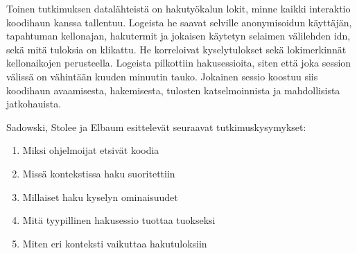 \documentclass[finnish]{../tktltiki2}
\theoremstyle{definition}
\theoremstyle{remark}
\begin{document}
Toinen tutkimuksen datalähteistä on hakutyökalun lokit, minne kaikki interaktio koodihaun kanssa tallentuu. Logeista he saavat selville anonymisoidun käyttäjän, tapahtuman kellonajan, hakutermit ja jokaisen käytetyn selaimen välilehden idn, sekä mitä tuloksia on klikattu. He korreloivat kyselytulokset sekä lokimerkinnät kellonaikojen perusteella. Logeista pilkottiin hakusessioita, siten että joka session välissä on vähintään kuuden minuutin tauko. Jokainen sessio koostuu siis koodihaun avaamisesta, hakemisesta, tulosten katselmoinnista ja mahdollisista jatkohauista. %






Sadowski, Stolee ja Elbaum esittelevät seuraavat tutkimuskysymykset:

\begin{enumerate}

  \item Miksi ohjelmoijat etsivät koodia %

  \item Missä kontekstissa haku suoritettiin %

  \item Millaiset haku kyselyn ominaisuudet %

  \item Mitä tyypillinen hakusessio tuottaa tuokseksi

  \item Miten eri konteksti vaikuttaa hakutuloksiin

\end{enumerate}
\end{document}
